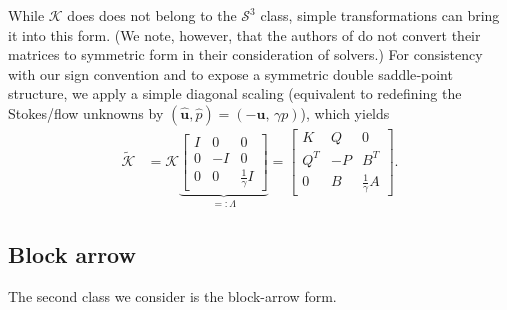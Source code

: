 \documentclass{article}
\newcommand{\st}{\mathcal{S}^3}
\newcommand{\sK}{\mathcal{K}}
\begin{document}
While $\sK$ does does not belong to the $\st$ class, simple transformations can bring it into this form. (We note, however, that the authors of \cite{ffjct19} do not convert their matrices to symmetric form in their consideration of solvers.) For consistency with our sign convention and to expose a symmetric double saddle‑point structure, we apply a simple diagonal scaling (equivalent to redefining the Stokes/flow unknowns by \((\hat{\boldsymbol u},\hat p)=(-\boldsymbol u,\,\gamma p)\)), which yields
\begin{align*}
\tilde{\sK} &= \sK \underbrace{\begin{bmatrix}
	I & 0 & 0 \\
	0 & -I & 0 \\
	0 & 0 & \frac{1}{\gamma} I
	\end{bmatrix}}_{=: \Lambda} = \begin{bmatrix}
K & Q & 0 \\
Q^T & -P & B^T \\
0 & B & \frac{1}{\gamma}A
\end{bmatrix}.
\end{align*}

\subsection{Block arrow}
The second class we consider is the block-arrow form.
\end{document}
